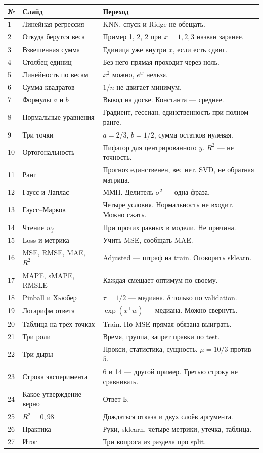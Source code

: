 \documentclass[11pt,a4paper]{article}
\begin{document}
{\footnotesize\begin{longtable}{@{}P{8mm}P{48mm}P{97mm}@{}}
\toprule
№ & Слайд & Переход\\
\midrule
{} & Линейная регрессия & KNN, спуск и Ridge не обещать.\\
2 & Откуда берутся веса & Пример 1, 2, 2 при \(x=1,2,3\) назван заранее.\\
3 & Взвешенная сумма & Единица уже внутри \(x\), если есть сдвиг.\\
4 & Столбец единиц & Без него прямая проходит через ноль.\\
5 & Линейность по весам & \(x^{2}\) можно, \(e^{w}\) нельзя.\\
6 & Сумма квадратов & \(1/n\) не двигает минимум.\\
7 & Формулы \(a\) и \(b\) & Вывод на доске. Константа --- среднее.\\
8 & Нормальные уравнения & Градиент, гессиан, единственность при полном ранге.\\
9 & Три точки & \(a=2/3\), \(b=1/2\), сумма остатков нулевая.\\
10 & Ортогональность & Пифагор для центрированного \(y\). \(R^{2}\) --- не точность.\\
11 & Ранг & Прогноз единственен, вес нет. SVD, не обратная матрица.\\
12 & Гаусс и Лаплас & ММП. Делитель \(\sigma^{2}\) --- одна фраза.\\
13 & Гаусс--Марков & Четыре условия. Нормальность не входит. Можно сжать.\\
14 & Чтение \(w_j\) & При прочих равных в модели. Не причина.\\
15 & Loss и метрика & Учить MSE, сообщать MAE.\\
16 & MSE, RMSE, MAE, \(R^{2}\) & Adjusted --- штраф на train. Оговорить sklearn.\\
17 & MAPE, sMAPE, RMSLE & Каждая смещает оптимум по-своему.\\
18 & Pinball и Хьюбер & \(\tau=1/2\) --- медиана. \(\delta\) только по validation.\\
19 & Логарифм ответа & \(\exp(x^{\top}w)\) --- медиана. Можно свернуть.\\
20 & Таблица на трёх точках & Train. По MSE прямая обязана выиграть.\\
21 & Три роли & Время, группа, запрет правки по test.\\
22 & Три дыры & Прокси, статистика, сущность. \(\mu=10/3\) против \(5\).\\
23 & Строка эксперимента & 6 и 14 --- другой пример. Третью строку не сравнивать.\\
24 & Какое утверждение верно & Ответ Б.\\
25 & \(R^{2}=0{,}98\) & Дождаться отказа и двух слоёв аргумента.\\
26 & Практика & Руки, sklearn, четыре метрики, утечка, таблица.\\
27 & Итог & Три вопроса из раздела про split.\\
\bottomrule
\end{longtable}}
\end{document}
